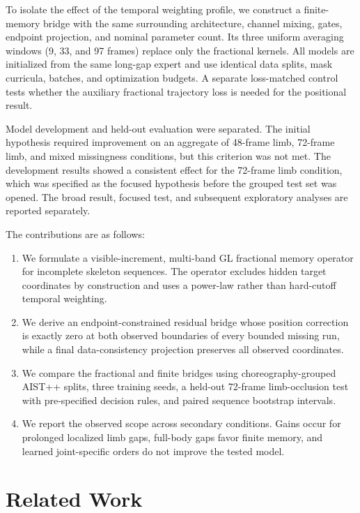 \documentclass[fractalfract,article,submit,moreauthors,pdftex]{Definitions/mdpi}
\begin{document}
To isolate the effect of the temporal weighting profile, we construct a finite-memory bridge with the same surrounding architecture, channel mixing, gates, endpoint projection, and nominal parameter count. Its three uniform averaging windows (9, 33, and 97 frames) replace only the fractional kernels. All models are initialized from the same long-gap expert and use identical data splits, mask curricula, batches, and optimization budgets. A separate loss-matched control tests whether the auxiliary fractional trajectory loss is needed for the positional result.

Model development and held-out evaluation were separated. The initial hypothesis required improvement on an aggregate of 48-frame limb, 72-frame limb, and mixed missingness conditions, but this criterion was not met. The development results showed a consistent effect for the 72-frame limb condition, which was specified as the focused hypothesis before the grouped test set was opened. The broad result, focused test, and subsequent exploratory analyses are reported separately.

The contributions are as follows:
\begin{enumerate}
\item We formulate a visible-increment, multi-band GL fractional memory operator for incomplete skeleton sequences. The operator excludes hidden target coordinates by construction and uses a power-law rather than hard-cutoff temporal weighting.
\item We derive an endpoint-constrained residual bridge whose position correction is exactly zero at both observed boundaries of every bounded missing run, while a final data-consistency projection preserves all observed coordinates.
\item We compare the fractional and finite bridges using choreography-grouped AIST++ splits, three training seeds, a held-out 72-frame limb-occlusion test with pre-specified decision rules, and paired sequence bootstrap intervals.
\item We report the observed scope across secondary conditions. Gains occur for prolonged localized limb gaps, full-body gaps favor finite memory, and learned joint-specific orders do not improve the tested model.
\end{enumerate}

\section{Related Work}
\end{document}
